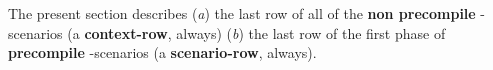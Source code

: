 The present section describes
(\emph{a}) the last row of all of the \textbf{non precompile} -scenarios (a \textbf{context-row}, always)
(\emph{b}) the last row of the first phase of \textbf{precompile} -scenarios (a \textbf{scenario-row}, always).
